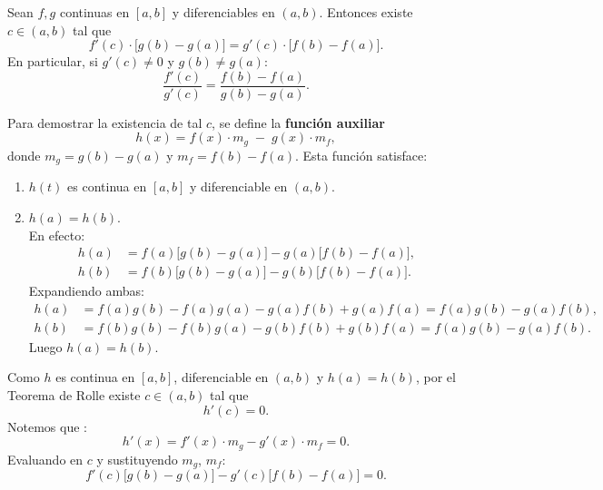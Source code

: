 \begin{teorema}
Sean $f,g$ continuas en $[a,b]$ y diferenciables en $(a,b)$. Entonces existe $c \in (a,b)$ tal que
\[
\boxed{
    f'(c)\cdot\bigl[g(b)-g(a)\bigr] = g'(c)\cdot\bigl[f(b)-f(a)\bigr].
}
\]
En particular, si $g'(c) \neq 0$ y $g(b) \neq g(a)$:
\[
    \frac{f'(c)}{g'(c)} = \frac{f(b)-f(a)}{g(b)-g(a)}.
\]
\end{teorema}
\begin{prueba}
    Para demostrar la existencia de tal $c$, se define la \textbf{funci\'on auxiliar}
\[
    h(x) = f(x)\cdot m_g \;-\; g(x)\cdot m_f,
\]
donde $m_g = g(b)-g(a)$ y $m_f = f(b)-f(a)$. Esta funci\'on satisface:
\begin{enumerate}
    \item $h(t)$ es continua en $[a,b]$ y diferenciable en $(a,b)$.
    \item $h(a) = h(b)$.\\ En efecto:
    \begin{align*}
        h(a) &= f(a)\bigl[g(b)-g(a)\bigr] - g(a)\bigl[f(b)-f(a)\bigr],\\
        h(b) &= f(b)\bigl[g(b)-g(a)\bigr] - g(b)\bigl[f(b)-f(a)\bigr].
    \end{align*}
    Expandiendo ambas:
    \begin{align*}
        h(a) &= f(a)g(b) - f(a)g(a) - g(a)f(b) + g(a)f(a) = f(a)g(b) - g(a)f(b),\\
        h(b) &= f(b)g(b) - f(b)g(a) - g(b)f(b) + g(b)f(a) = f(a)g(b) - g(a)f(b).
    \end{align*}
    Luego $h(a) = h(b)$. 
\end{enumerate}

\medskip

Como $h$ es continua en $[a,b]$,
diferenciable en $(a,b)$ y $h(a)=h(b)$, por el Teorema de Rolle existe $c \in (a,b)$ tal que
\[
    h'(c) = 0.
\]
Notemos que :
\[
    h'(x) = f'(x)\cdot m_g - g'(x)\cdot m_f=0.
\]
Evaluando en $c$ y sustituyendo $m_g$, $m_f$:
\[
    f'(c)\bigl[g(b)-g(a)\bigr] - g'(c)\bigl[f(b)-f(a)\bigr] = 0.
\]
\end{prueba}

